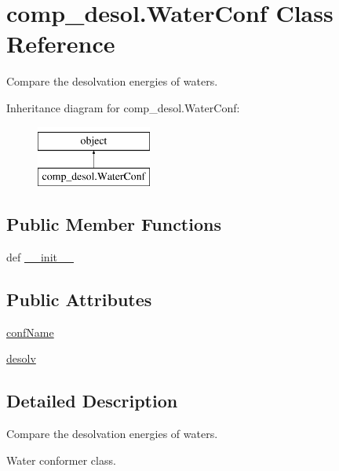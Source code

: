 \hypertarget{classcomp__desol_1_1_water_conf}{\section{comp\-\_\-desol.\-Water\-Conf Class Reference}
\label{classcomp__desol_1_1_water_conf}
}


Compare the desolvation energies of waters.  


Inheritance diagram for comp\-\_\-desol.\-Water\-Conf\-:\begin{figure}[H]
\begin{center}
\leavevmode
\includegraphics[height=2.000000cm]{classcomp__desol_1_1_water_conf}
\end{center}
\end{figure}
\subsection*{Public Member Functions}
\begin{DoxyCompactItemize}
\item 
def \hyperlink{classcomp__desol_1_1_water_conf_a0fb421de7d4a112769e5da6004c51b93}{\-\_\-\-\_\-init\-\_\-\-\_\-}
\end{DoxyCompactItemize}
\subsection*{Public Attributes}
\begin{DoxyCompactItemize}
\item 
\hyperlink{classcomp__desol_1_1_water_conf_a5b1921836f354b358be05d4ea6b93ae6}{conf\-Name}
\item 
\hyperlink{classcomp__desol_1_1_water_conf_aaf4a467d6793dea2e163ba5e7aa1888c}{desolv}
\end{DoxyCompactItemize}


\subsection{Detailed Description}
Compare the desolvation energies of waters. 

Water conformer class. 

